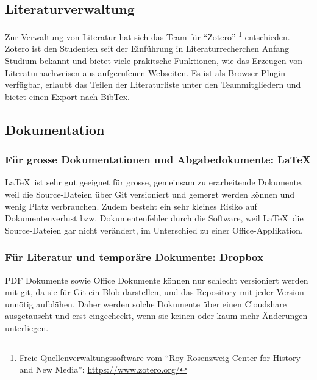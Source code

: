 				
		\subsection*{Literaturverwaltung}
			Zur Verwaltung von Literatur hat sich das Team für "`Zotero"' \footnote{Freie Quellenverwaltungssoftware vom "`Roy Rosenzweig Center for History and New Media"': \url{https://www.zotero.org/}} entschieden.
			Zotero ist den Studenten seit der Einführung in Literaturrecherchen Anfang Studium bekannt und
			bietet viele prakitsche Funktionen, wie das Erzeugen von Literaturnachweisen aus aufgerufenen Webseiten.
			Es ist als Browser Plugin verfügbar, erlaubt das Teilen der Literaturliste unter den Teammitgliedern und bietet einen Export nach BibTex.
			

		\subsection*{Dokumentation}
			\subsubsection*{Für grosse Dokumentationen und Abgabedokumente: \LaTeX}
				\LaTeX\ ist sehr gut geeignet für grosse, gemeinsam zu erarbeitende Dokumente,
				weil die Source-Dateien über Git versioniert und gemergt werden können und wenig
				Platz verbrauchen. 
				Zudem besteht ein sehr kleines Risiko auf Dokumentenverlust
				bzw. Dokumentenfehler durch die Software, weil \LaTeX\ die Source-Dateien gar
				nicht verändert, im Unterschied zu einer Office-Applikation.
				
			\subsubsection*{Für Literatur und temporäre Dokumente: Dropbox}
			PDF Dokumente sowie Office Dokumente können nur schlecht versioniert werden mit git, 
			da sie für Git ein Blob darstellen, und das Repository mit jeder Version unnötig aufblähen.
			Daher werden solche Dokumente über einen Cloudshare ausgetauscht und erst eingecheckt, 
			wenn sie keinen oder kaum mehr Änderungen unterliegen.
				
